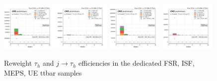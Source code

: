 \begin{figure}
    \includegraphics[width=0.24\textwidth]{appendices/qcdSF/figures/123j1b/mu_nBJets_True.png}
    \includegraphics[width=0.24\textwidth]{appendices/qcdSF/figures/123j1b/mu_nBJets_False.png}
    \includegraphics[width=0.24\textwidth]{appendices/qcdSF/figures/123j1b/e_nBJets_True.png}
    \includegraphics[width=0.24\textwidth]{appendices/qcdSF/figures/123j1b/e_nBJets_False.png}
    

    \caption{Reweight $\tau_h$ and $j \to \tau_h$ efficiencies in the dedicated FSR, ISF, MEPS, UE ttbar samples}
    \label{fig:appendix:123j1b}
\end{figure}


